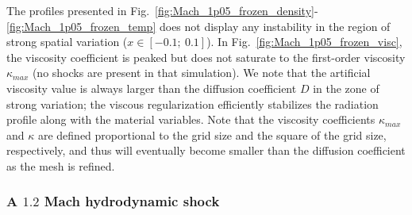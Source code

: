 \documentclass[review]{elsarticle}
\newcommand{\fig}[1]{Fig.~\ref{#1}}                      %
\newcommand{\tcb}[1]{\textcolor{blue}{#1}}
\begin{document}
%
The profiles presented in \fig{fig:Mach_1p05_frozen_density}-\ref{fig:Mach_1p05_frozen_temp} does not display any instability in the region of strong spatial variation
($x \in \left[ -0.1;\  0.1 \right]$). In \fig{fig:Mach_1p05_frozen_visc}, the viscosity coefficient is peaked but does not saturate to the first-order viscosity $\kappa_{max}$ (no shocks are present in that simulation). We note that the artificial viscosity value is always larger than the diffusion coefficient $D$ in the zone of strong variation; the viscous regularization efficiently stabilizes the radiation profile along with the material variables. Note that the viscosity coefficients $\kappa_{max}$ and $\kappa$ are defined proportional to the grid size and the square of the grid size, respectively, and thus will eventually become smaller than the diffusion coefficient as the mesh is refined. %

\subsubsection{A $1.2$ Mach hydrodynamic shock}
\end{document}
